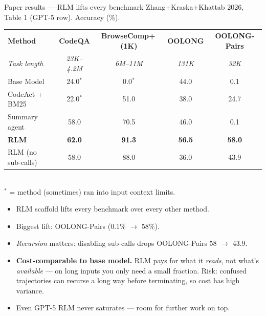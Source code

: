 \documentclass[aspectratio=169,10pt]{beamer}
\begin{document}
\begin{frame}{Paper results --- RLM lifts every benchmark}
\small Zhang+Kraska+Khattab 2026, Table 1 (GPT-5 row). Accuracy (\%).
\vspace{0.4em}
\centering
\renewcommand{\arraystretch}{1.25}
\footnotesize
\begin{tabular}{@{}l c c c c@{}}
\toprule
\textbf{Method} & \textbf{CodeQA} & \textbf{BrowseComp+\,(1K)} & \textbf{OOLONG} & \textbf{OOLONG-Pairs} \\
\textit{\scriptsize Task length} & \textit{\scriptsize 23K--4.2M} & \textit{\scriptsize 6M--11M} & \textit{\scriptsize 131K} & \textit{\scriptsize 32K} \\
\midrule
Base Model              & 24.0$^*$ & 0.0$^*$  & 44.0 & 0.1 \\
CodeAct + BM25          & 22.0$^*$ & 51.0     & 38.0 & 24.7 \\
Summary agent           & 58.0     & 70.5     & 46.0 & 0.1 \\
\rowcolor{crimson!10}\textbf{RLM} & \textbf{62.0} & \textbf{91.3} & \textbf{56.5} & \textbf{58.0} \\
RLM (no sub-calls)      & 58.0 & 88.0 & 36.0 & 43.9 \\
\bottomrule
\end{tabular}
\vspace{0.2em}\\
{\scriptsize $^*$ = method (sometimes) ran into input context limits.}

\vspace{0.6em}
\begin{itemize}\setlength{\itemsep}{0.2em}
  \item RLM scaffold lifts every benchmark over every other method.
  \item Biggest lift: OOLONG-Pairs (0.1\% $\to$ 58\%).
  \item \emph{Recursion} matters: disabling sub-calls drops OOLONG-Pairs 58 $\to$ 43.9.
  \item \textbf{Cost-comparable to base model.} RLM pays for what it
        \emph{reads}, not what's \emph{available} --- on long inputs you only
        need a small fraction. Risk: confused trajectories can recurse a long
        way before terminating, so cost has high variance.
  \item Even GPT-5 RLM never saturates --- room for further work on top.
\end{itemize}
\end{frame}
\end{document}
